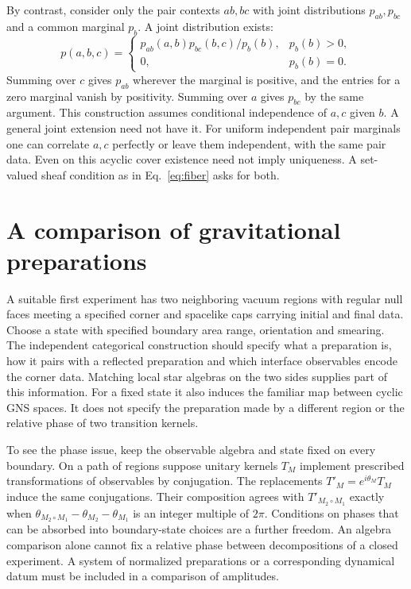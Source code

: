 \documentclass[11pt,letterpaper]{article}
\begin{document}
By contrast, consider only the pair contexts \(ab,bc\) with joint
distributions \(p_{ab},p_{bc}\) and a common marginal \(p_b\). A joint
distribution exists:
\[
 p(a,b,c)=
 \begin{cases}
   p_{ab}(a,b)p_{bc}(b,c)/p_b(b), & p_b(b)>0,\\
   0, & p_b(b)=0 .
 \end{cases}
\]
Summing over \(c\) gives \(p_{ab}\) wherever the marginal is positive,
and the entries for a zero marginal vanish by positivity. Summing over
\(a\) gives \(p_{bc}\) by the same argument. This construction assumes
conditional independence of \(a,c\) given \(b\). A general joint extension
need not have it. For uniform independent pair marginals one can correlate
\(a,c\) perfectly or leave them independent, with the same pair data.
Even on this acyclic cover existence need not imply uniqueness.
A set-valued sheaf condition as in Eq.~\eqref{eq:fiber} asks for both.

\section{A comparison of gravitational preparations}
\label{sec:gravity}
A suitable first experiment has two neighboring vacuum regions with
regular null faces meeting a specified corner and spacelike caps carrying
initial and final data. Choose a state with specified boundary area range,
orientation and smearing. The independent categorical construction should
specify what a preparation is, how it pairs with a reflected preparation
and which interface observables encode the corner data. Matching local
star algebras on the two sides supplies part of this information. For a
fixed state it also induces the familiar map between cyclic GNS spaces.
It does not specify the preparation made by a different region or the
relative phase of two transition kernels.

To see the phase issue, keep the observable algebra and state fixed on
every boundary. On a path of regions suppose unitary kernels \(T_M\)
implement prescribed transformations of observables by conjugation.
The replacements \(T'_M=e^{i\theta_M}T_M\) induce the same conjugations.
Their composition agrees with \(T'_{M_2\circ M_1}\) exactly when
\(\theta_{M_2\circ M_1}-\theta_{M_2}-\theta_{M_1}\) is an integer multiple
of \(2\pi\). Conditions on phases that can be absorbed into boundary-state
choices are a further freedom. An algebra comparison alone cannot fix
a relative phase between decompositions of a closed experiment. A system
of normalized preparations or a corresponding dynamical datum must be
included in a comparison of amplitudes.
\end{document}

